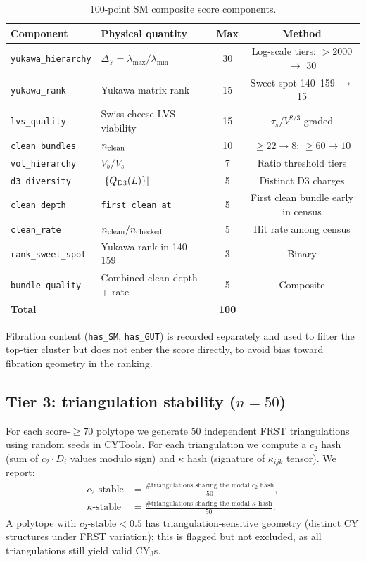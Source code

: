 \documentclass[11pt,a4paper]{article}
\begin{document}
\begin{table}[H]
\centering
\caption{100-point SM composite score components.}
\label{tab:score}
\small
\begin{tabular}{llcc}
\toprule
Component & Physical quantity & Max & Method \\
\midrule
\texttt{yukawa\_hierarchy} & $\Delta_Y = \lambda_{\max}/\lambda_{\min}$
  & 30 & Log-scale tiers: $>2000$ $\to$ 30 \\
\texttt{yukawa\_rank} & Yukawa matrix rank
  & 15 & Sweet spot 140--159 $\to$ 15 \\
\texttt{lvs\_quality} & Swiss-cheese LVS viability
  & 15 & $\tau_s/V^{2/3}$ graded \\
\texttt{clean\_bundles} & $n_{\rm clean}$
  & 10 & $\geq 22 \to 8$; $\geq 60 \to 10$ \\
\texttt{vol\_hierarchy} & $V_b/V_s$
  & 7  & Ratio threshold tiers \\
\texttt{d3\_diversity} & $|\{Q_{\rm D3}(L)\}|$
  & 5  & Distinct D3 charges \\
\texttt{clean\_depth} & \texttt{first\_clean\_at}
  & 5  & First clean bundle early in census \\
\texttt{clean\_rate} & $n_{\rm clean}/n_{\rm checked}$
  & 5  & Hit rate among census \\
\texttt{rank\_sweet\_spot} & Yukawa rank in 140--159
  & 3  & Binary \\
\texttt{bundle\_quality} & Combined clean depth + rate
  & 5  & Composite \\
\midrule
\textbf{Total} & & \textbf{100} & \\
\bottomrule
\end{tabular}
\end{table}

\noindent
Fibration content (\texttt{has\_SM}, \texttt{has\_GUT}) is recorded
separately and used to filter the top-tier cluster but does not
enter the score directly, to avoid bias toward fibration geometry
in the ranking.

\subsection{Tier 3: triangulation stability ($n=50$)}

For each score-$\geq 70$ polytope we generate 50 independent
FRST triangulations using random seeds in CYTools.
For each triangulation we compute a $c_2$ hash
(sum of $c_2\cdot D_i$ values modulo sign) and $\kappa$ hash
(signature of $\kappa_{ijk}$ tensor).
We report:
\begin{align*}
  c_2\text{-stable} &=
    \frac{\text{\# triangulations sharing the modal }c_2\text{ hash}}{50},
  \\
  \kappa\text{-stable} &=
    \frac{\text{\# triangulations sharing the modal }\kappa\text{ hash}}{50}.
\end{align*}
A polytope with $c_2\text{-stable} < 0.5$ has triangulation-sensitive
geometry (distinct CY structures under FRST variation); this is
flagged but not excluded, as all triangulations still yield valid
CY$_3$s.
\end{document}
